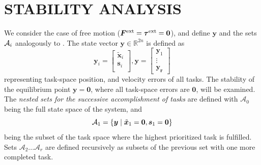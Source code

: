 \documentclass[../main.tex]{subfiles}
\begin{document}
\section{STABILITY ANALYSIS}
\label{sec:stability_proofs}


We consider the case of free motion ($\bm{F}^{\rm ext}=\bm{\tau}^{\rm ext}=\bm{0}$), and define $\bm{y}$ and the sets ${\cal{A}}_i$ analogously to \cite[Section IV.A]{dietrich2020}. The state vector $\bm{y} \in \mathbb{R}^{2n}$ is defined as
\begin{equation}
   \bm{y}_i = \begin{bmatrix}
        \tilde{\bm{x}}_i \\
        \bm{s}_i \\
    \end{bmatrix},
    \bm{y} = \begin{bmatrix}
        \bm{y}_1 \\
        \vdots \\
        \bm{y_r}
    \end{bmatrix}
\end{equation}
representing task-space position, and velocity errors of all tasks. The stability of the equilibrium point $\bm{y} = \bm{0}$, where all task-space errors are $\bm{0}$, will be examined. The \emph{nested sets for the successive accomplishment of tasks} \cite{dietrich2020} are defined with $\mathcal{A}_0$ being the full state space of the system, and
\begin{equation}
    \label{eq:set_A1}
    {\cal A}_1 = \{ \space \bm{y} \mid \tilde{\bm{x}}_1 = \bm{0}, \bm{s}_1 = \bm{0} \}
\end{equation}
being the subset of the task space where the highest prioritized task is fulfilled. Sets $\mathcal{A}_2 ... \mathcal{A}_r$ are defined recursively as subsets of the previous set with one more completed task.
\end{document}
